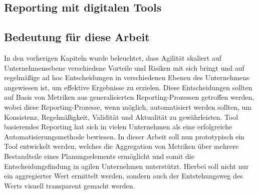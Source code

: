 \subsection{Reporting mit digitalen Tools}
\cite{guidelinesForPortfoliomanagement}

\subsection{Bedeutung für diese Arbeit}
In den vorherigen Kapiteln wurde beleuchtet, dass Agilität skaliert auf Unternehmensebene verschiedene Vorteile und  Risiken mit sich bringt und auf regelmäßige ad hoc Entscheidungen in verschiedenen Ebenen des Unternehmens angewiesen ist, um effektive Ergebnisse zu erzielen. Diese Entscheidungen sollten auf Basis von Metriken aus generalisierten Reporting-Prozessen getroffen werden, wobei diese Reporting-Prozesse, wenn möglich, automatisiert werden sollten, um Konsistenz, Regelmäßigkeit, Validität und Aktualität zu gewährleisten. Tool basierendes Reporting hat sich in vielen Unternehmen als eine erfolgreiche Automatisierungsmethode bewiesen.
In dieser Arbeit soll nun prototypisch ein Tool entwickelt werden, welches die Aggregation von Metriken über mehrere Bestandteile eines Planungselements ermöglicht und somit die Entscheidungsfindung in agilen Unternehmen unterstützt. Hierbei soll nicht nur ein aggregierter Wert ermittelt werden, sondern auch der Entstehungsweg des Werts visuell transparent gemacht werden.
